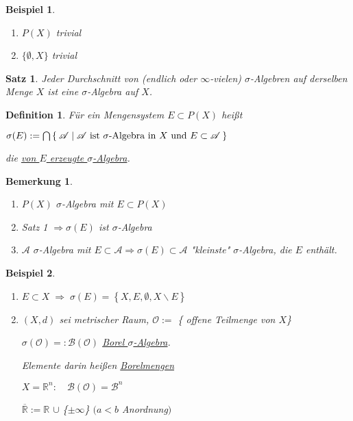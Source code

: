 \documentclass[11pt]{memoir}
\theoremstyle{changebreak}
\newtheorem{Definition}{Definition}[chapter]
\newtheorem{Bemerkung}{Bemerkung}[chapter]
\newtheorem{Beispiel}{Beispiel}[chapter]
\newtheorem{Satz}{Satz}[chapter]
\begin{document}
\begin{Beispiel}
\begin{enumerate}
	\item $P(X)$\; trivial
	\item $\{ \emptyset, X \}$\; trivial
\end{enumerate}
\end{Beispiel}

\begin{Satz}
Jeder Durchschnitt von (endlich oder $\infty$-vielen) $\sigma$-Algebren auf derselben Menge $X$ ist eine $\sigma$-Algebra auf $X$.
\end{Satz}

\begin{Definition}
Für ein Mengensystem $E \subset P(X)$ heißt 
\begin{center}
$\sigma(E):=\bigcap \Set{\mathscr{A}| \mathscr{A} \text{ ist } \sigma\text{-Algebra in }X\text{ und } E \subset \mathscr{A} }$
\end{center}
die \underline{von $E$ erzeugte $\sigma$-Algebra}.
\end{Definition}

\begin{Bemerkung}
\begin{enumerate}
	\item $P(X)$ $\sigma$-Algebra mit $E \subset P(X)$
	\item Satz 1 $\Rightarrow \sigma(E)$ ist $\sigma$-Algebra
	\item $\mathscr{A}$ $\sigma$-Algebra mit $E \subset \mathscr{A} \Rightarrow \sigma(E) \subset 		\mathscr{A}$ "kleinste"\; $\sigma$-Algebra, die $E$ enthält.
\end{enumerate}
\end{Bemerkung}

\begin{Beispiel}
\begin{enumerate}
	\item $E \subset X \; \Rightarrow \; \sigma(E) = \left\{X, E, \emptyset, X \backslash E\right\}$
	\item $(X, d)$ sei metrischer Raum, $\mathscr{O}:=$ \{ offene Teilmenge von $X$\} 
	\begin{center}
		$\sigma(\mathscr{O})=:\mathscr{B(O)}$ \quad \underline{Borel $\sigma$-Algebra}. 
	\end{center}
	Elemente darin heißen  \underline{Borelmengen} 
	\par
	$X = \mathbb{R}^{n}: \quad \mathscr{B(O)} = \mathscr{B}^{n}$ 
	\par
	$\overline{\mathbb{R}} := \mathbb{R}$  $\cup$ \{$\pm\infty$\} \quad $(a < b$ Anordnung$)$
\end{enumerate}
\end{Beispiel}
\end{document}
